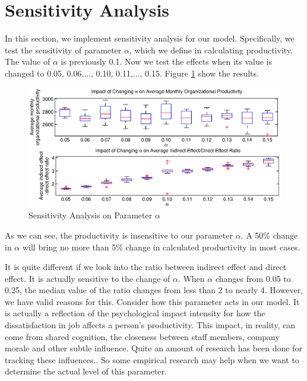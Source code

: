 \documentclass[tcn = 37075, sheet = false, abstract = false]{mcmthesis}
\begin{document}
	\section{Sensitivity Analysis}
	
	In this section, we implement sensitivity analysis for our model. Specifically, we test the sensitivity of parameter $\alpha$, which we define in calculating productivity. The value of $\alpha$ is previously 0.1. Now we test the effects when its value is changed to 0.05, 0.06,..., 0.10, 0.11,..., 0.15. Figure \ref{fig:sa} show the results. 
	
	\begin{figure}[htb!]
		\centering
		\includegraphics[width=16cm]{figures/Sensitivity.eps}
		\caption{Sensitivity Analysis on Parameter $\alpha$} 
		\label{fig:sa}
	\end{figure}
	
	As we can see, the productivity is insensitive to our parameter $\alpha$. A 50\% change in $\alpha$ will bring no more than 5\% change in calculated productivity in most cases. 
	
	It is quite different if we look into the ratio between indirect effect and direct effect. It is actually sensitive to the change of $\alpha$. When $\alpha$ changes from 0.05 to 0.25, the median value of the ratio changes from less than 2 to nearly 4. However, we have valid reasons for this. Consider how this parameter acts in our model. It is actually a reflection of the psychological impact intensity for how the dissatisfaction in job affects a person's productivity. This impact, in reality, can come from shared cognition, the closeness between staff members, company morale and other subtle influence. Quite an amount of research has been done for tracking these influences.\cite{seligman2000positive}. So some empirical research may help when we want to determine the actual level of this parameter.
	
\end{document}
